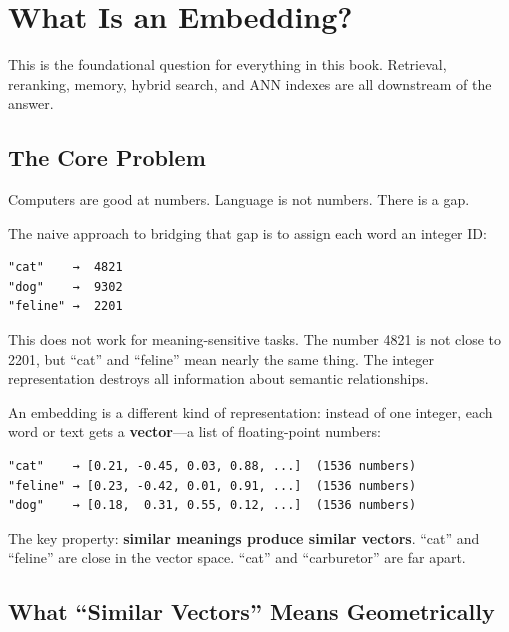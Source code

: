 \chapter{What Is an Embedding?}

This is the foundational question for everything in this book. Retrieval, reranking,
memory, hybrid search, and ANN indexes are all downstream of the answer.

\section{The Core Problem}

Computers are good at numbers. Language is not numbers. There is a gap.

The naive approach to bridging that gap is to assign each word an integer ID:

\begin{Verbatim}
"cat"    →  4821
"dog"    →  9302
"feline" →  2201
\end{Verbatim}

This does not work for meaning-sensitive tasks. The number 4821 is not close to 2201,
but ``cat'' and ``feline'' mean nearly the same thing. The integer representation destroys
all information about semantic relationships.

An embedding is a different kind of representation: instead of one integer, each word or
text gets a \textbf{vector}---a list of floating-point numbers:

\begin{Verbatim}
"cat"    → [0.21, -0.45, 0.03, 0.88, ...]  (1536 numbers)
"feline" → [0.23, -0.42, 0.01, 0.91, ...]  (1536 numbers)
"dog"    → [0.18,  0.31, 0.55, 0.12, ...]  (1536 numbers)
\end{Verbatim}

The key property: \textbf{similar meanings produce similar vectors}. ``cat'' and ``feline''
are close in the vector space. ``cat'' and ``carburetor'' are far apart.

\section{What ``Similar Vectors'' Means Geometrically}

